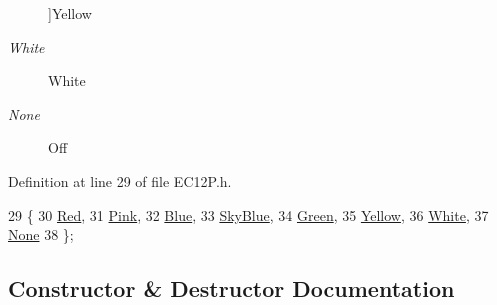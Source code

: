 \begin{Desc}
\begin{description}
{}]Yellow \item[{\em 
\hypertarget{class_hardware_1_1_e_c12_p_a8341f410cd939bf03160fe239bc782aaacd1663fa4d06aa68eca32bbf370d9e15}{}White\label{class_hardware_1_1_e_c12_p_a8341f410cd939bf03160fe239bc782aaacd1663fa4d06aa68eca32bbf370d9e15}
}]White \item[{\em 
\hypertarget{class_hardware_1_1_e_c12_p_a8341f410cd939bf03160fe239bc782aaa0a40adb50c361b3ee3a6faca241d7c7a}{}None\label{class_hardware_1_1_e_c12_p_a8341f410cd939bf03160fe239bc782aaa0a40adb50c361b3ee3a6faca241d7c7a}
}]Off \end{description}
\end{Desc}


Definition at line 29 of file E\+C12\+P.\+h.


\begin{DoxyCode}
29              \{
30     \hyperlink{class_hardware_1_1_e_c12_p_a8341f410cd939bf03160fe239bc782aaa3b57c8754eb52c7023d81c7c45687f05}{Red},     
31     \hyperlink{class_hardware_1_1_e_c12_p_a8341f410cd939bf03160fe239bc782aaab5841c141282166e57407746841ff248}{Pink},    
32     \hyperlink{class_hardware_1_1_e_c12_p_a8341f410cd939bf03160fe239bc782aaa3f67a6d3b6004f86b8e4a477b3c5f915}{Blue},    
33     \hyperlink{class_hardware_1_1_e_c12_p_a8341f410cd939bf03160fe239bc782aaaac948b76451e5914627c3b482c5054c4}{SkyBlue}, 
34     \hyperlink{class_hardware_1_1_e_c12_p_a8341f410cd939bf03160fe239bc782aaafaadad2fea189e40df690d3bde44ac28}{Green},   
35     \hyperlink{class_hardware_1_1_e_c12_p_a8341f410cd939bf03160fe239bc782aaa25b4723962c85776a4ce70b8eee81263}{Yellow},  
36     \hyperlink{class_hardware_1_1_e_c12_p_a8341f410cd939bf03160fe239bc782aaacd1663fa4d06aa68eca32bbf370d9e15}{White},   
37     \hyperlink{class_hardware_1_1_e_c12_p_a8341f410cd939bf03160fe239bc782aaa0a40adb50c361b3ee3a6faca241d7c7a}{None}     
38   \};
\end{DoxyCode}


\subsection{Constructor \& Destructor Documentation}
\hypertarget{class_hardware_1_1_e_c12_p_a0b5c45d061ad98239e816e3845535d15}{}
